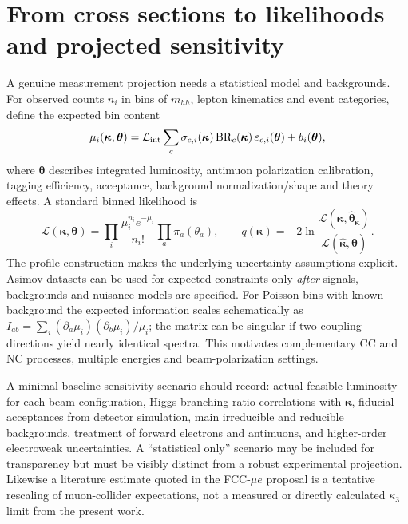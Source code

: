 \documentclass[12pt,a4paper]{article}
\newcommand{\newnote}{\clearpage}
\newcommand{\eps}{\varepsilon}
\newcommand{\Lumi}{\mathcal{L}}
\begin{document}
\newnote

\section{From cross sections to likelihoods and projected sensitivity}
A genuine measurement projection needs a statistical model and backgrounds. For observed counts $n_i$ in bins of $m_{hh}$, lepton kinematics and event categories, define the expected bin content
\begin{equation}
\mu_i(\bm\kappa,\bm\theta)=\Lumi_{\rm int}
 \sum_c\sigma_{c,i}(\bm\kappa)\,
 \mathrm{BR}_c(\bm\kappa)\,\eps_{c,i}(\bm\theta)
 +b_i(\bm\theta),
\end{equation}
where $\bm\theta$ describes integrated luminosity, antimuon polarization calibration, tagging efficiency, acceptance, background normalization/shape and theory effects. A standard binned likelihood is
\begin{equation}\label{eq:likelihood}
\mathcal L(\bm\kappa,\bm\theta)
=\prod_i\frac{\mu_i^{n_i}e^{-\mu_i}}{n_i!}
\prod_a\pi_a(\theta_a),\qquad
q(\bm\kappa)=-2\ln\frac{\mathcal L(\bm\kappa,\hat{\bm\theta}_{\bm\kappa})}
{\mathcal L(\hat{\bm\kappa},\hat{\bm\theta})}.
\end{equation}
The profile construction makes the underlying uncertainty assumptions explicit. Asimov datasets can be used for expected constraints only \emph{after} signals, backgrounds and nuisance models are specified. For Poisson bins with known background the expected information scales schematically as $I_{ab}=\sum_i(\partial_a\mu_i)(\partial_b\mu_i)/\mu_i$; the matrix can be singular if two coupling directions yield nearly identical spectra. This motivates complementary CC and NC processes, multiple energies and beam-polarization settings.

A minimal baseline sensitivity scenario should record: actual feasible luminosity for each beam configuration, Higgs branching-ratio correlations with $\bm\kappa$, fiducial acceptances from detector simulation, main irreducible and reducible backgrounds, treatment of forward electrons and antimuons, and higher-order electroweak uncertainties. A ``statistical only'' scenario may be included for transparency but must be visibly distinct from a robust experimental projection. Likewise a literature estimate quoted in the FCC-$\mu e$ proposal is a tentative rescaling of muon-collider expectations, not a measured or directly calculated $\kappa_3$ limit from the present work.
\end{document}

